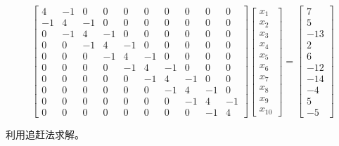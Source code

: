 \[
    \begin{bmatrix}
        4  & -1 & 0  & 0  & 0  & 0  & 0  & 0  & 0  & 0  \\
        -1 & 4  & -1 & 0  & 0  & 0  & 0  & 0  & 0  & 0  \\
        0  & -1 & 4  & -1 & 0  & 0  & 0  & 0  & 0  & 0  \\
        0  & 0  & -1 & 4  & -1 & 0  & 0  & 0  & 0  & 0  \\
        0  & 0  & 0  & -1 & 4  & -1 & 0  & 0  & 0  & 0  \\
        0  & 0  & 0  & 0  & -1 & 4  & -1 & 0  & 0  & 0  \\
        0  & 0  & 0  & 0  & 0  & -1 & 4  & -1 & 0  & 0  \\
        0  & 0  & 0  & 0  & 0  & 0  & -1 & 4  & -1 & 0  \\
        0  & 0  & 0  & 0  & 0  & 0  & 0  & -1 & 4  & -1 \\
        0  & 0  & 0  & 0  & 0  & 0  & 0  & 0  & -1 & 4
    \end{bmatrix}
    \begin{bmatrix}
        x_1 \\
        x_2 \\
        x_3 \\
        x_4 \\
        x_5 \\
        x_6 \\
        x_7 \\
        x_8 \\
        x_9 \\
        x_{10}
    \end{bmatrix}
    =
    \begin{bmatrix}
        7   \\
        5   \\
        -13 \\
        2   \\
        6   \\
        -12 \\
        -14 \\
        -4  \\
        5   \\
        -5
    \end{bmatrix}
\]

利用追赶法求解。